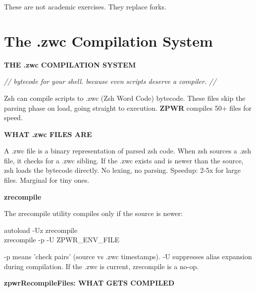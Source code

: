 \documentclass[11pt,a4paper,twoside]{book}
\begin{document}
These are not academic exercises. They replace forks.


\vspace{16pt}

\section{The .zwc Compilation System}


\vspace{10pt}
{\large\bfseries\color{neoncyan} THE .zwc COMPILATION SYSTEM}\vspace{6pt}

{\small\itshape\color{dimtext} // bytecode for your shell. because even scripts deserve a compiler. //}

Zsh can compile scripts to .zwc (Zsh Word Code) bytecode. These files skip the parsing phase on load, going straight to execution. \textbf{ZPWR} compiles 50+ files for speed.


\vspace{12pt}
{\bfseries\color{neonyellow} WHAT .zwc FILES ARE}\vspace{4pt}

A .zwc file is a binary representation of parsed zsh code. When zsh sources a .zsh file, it checks for a .zwc sibling. If the .zwc exists and is newer than the source, zsh loads the bytecode directly. No lexing, no parsing. Speedup: 2-5x for large files. Marginal for tiny ones.


\vspace{12pt}
{\bfseries\color{neonyellow} zrecompile}\vspace{4pt}

The zrecompile utility compiles only if the source is newer:

\begin{codebox}
\color{neongreen}autoload -Uz zrecompile\\
\color{neongreen}zrecompile -p -U ZPWR\_ENV\_FILE\\
\end{codebox}

-p means 'check pairs' (source vs .zwc timestamps). -U suppresses alias expansion during compilation. If the .zwc is current, zrecompile is a no-op.


\vspace{12pt}
{\bfseries\color{neonyellow} zpwrRecompileFiles: WHAT GETS COMPILED}\vspace{4pt}
\end{document}
